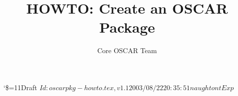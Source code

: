 \documentclass[letterpaper]{article}
\title{HOWTO: Create an OSCAR Package}
\author{Core OSCAR Team}
\begin{document}
\maketitle

\begin{center}
  {\catcode`\$=11\tiny\noindent Draft $Id: oscarpkg-howto.tex,v 1.1 2003/08/22 20:35:51 naughtont Exp $}
\end{center}






\end{document}
